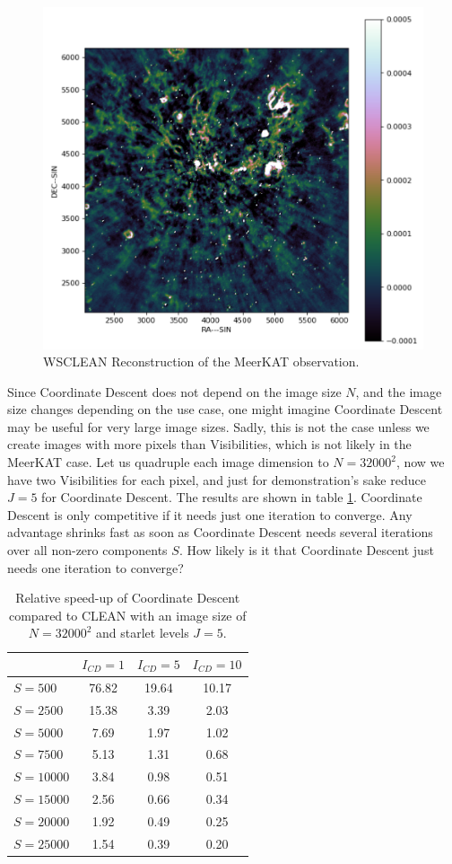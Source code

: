 \begin{figure}[h]
	\centering
	\includegraphics[width=0.6\linewidth]{./chapters/20.results/meerkat.png}
	\caption{WSCLEAN Reconstruction of the MeerKAT observation.}
	\label{results:wsclean}
\end{figure}

Since Coordinate Descent does not depend on the image size $N$, and the image size changes depending on the use case, one might imagine Coordinate Descent may be useful for very large image sizes. Sadly, this is not the case unless we create images with more pixels than Visibilities, which is not likely in the MeerKAT case. Let us quadruple each image dimension to $N=32000^2$, now we have two Visibilities for each pixel, and just for demonstration's sake reduce $J=5$ for Coordinate Descent. The results are shown in table \ref{res:cd:large:table}. Coordinate Descent is only competitive if it needs just one iteration to converge. Any advantage shrinks fast as soon as Coordinate Descent needs several iterations over all non-zero components $S$. How likely is it that Coordinate Descent just needs one iteration to converge?

\begin{table}[h!]
	\begin{center}
		\begin{tabular}{l|c|c|c} %
			& $I_{CD} = 1$ & $I_{CD} = 5$ &  $I_{CD} = 10$\\
			\hline
			$S=500$ & 76.82 &  19.64 & 10.17 \\
			$S=2500$ & 15.38 &  3.39 & 2.03 \\
			$S=5000$ & 7.69 &  1.97 & 1.02 \\
			$S=7500$ & 5.13 &  1.31 & 0.68 \\
			$S=10000$ & 3.84 &  0.98 & 0.51 \\
			\hline
			$S=15000$ & 2.56 &  0.66 & 0.34 \\
			$S=20000$ & 1.92 &  0.49 & 0.25 \\
			$S=25000$ & 1.54 &  0.39 & 0.20 \\
		\end{tabular}
		\caption{Relative speed-up of Coordinate Descent compared to CLEAN with an image size of $N=32000^2$ and starlet levels $J=5$. }
		\label{res:cd:large:table}
	\end{center}
\end{table}


